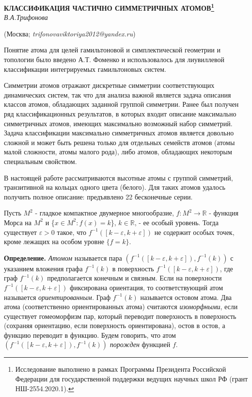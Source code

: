
\begin{center}
    {\bf КЛАССИФИКАЦИЯ  ЧАСТИЧНО СИММЕТРИЧНЫХ АТОМОВ\footnote{Исследование выполнено в рамках Программы Президента Российской Федерации для государственной поддержки ведущих научных школ РФ (грант НШ-2554.2020.1).}}\\

    {\it В.А.Трифонова}

    (Москва; {\it trifonovaviktoriya2012@yandex.ru})
\end{center}


Понятие атома для целей гамильтоновой и симплектической геометрии и топологии было введено А.Т.  Фоменко  и использовалось для лиувиллевой классификации интегрируемых гамильтоновых систем.


Симметрии атомов отражают дискретные симметрии соответствующих динамических систем, так что для  анализа важной является задача описания классов атомов, обладающих заданной группой симметрии. Ранее был получен ряд классификационных результатов, в которых входит описание максимально симметричных атомов, имеющих максимально возможный набор симметрий.  Задача классификации максимально симметричных атомов является довольно сложной  и может быть решена только для отдельных семейств атомов (атомы малой сложности, атомы малого рода), либо атомов, обладающих некоторым специальным свойством.

В 	настоящей работе рассматриваются высотные атомы с группой симметрий, транзитивной на кольцах одного цвета (белого). Для таких атомов удалось получить полное описание: предъявлено 22  бесконечные серии.




Пусть $M^2$ - гладкое компактное двумерное многообразие,  $f:M^2 \to \mathbb{R}$ - функция Морса	на $M^2$ и  \{$x\in M^2 \colon f(x)=k $\}, $k \in \mathbb{R}$, - ее особый уровень. Тогда существует ${\varepsilon > 0}$ такое, что ${f^{-1}([k-\varepsilon, k+\varepsilon ])}$ не содержит особых точек, кроме лежащих на особом уровне		$\{f=k\}$.
		
		
		
		{\bf Определение.}
		{\em Атомом} называется пара ${(f^{-1}([k-\varepsilon, k+\varepsilon ]), f^{-1}(k))}$ с указанием вложения графа ${f^{-1}(k)}$ в поверхность ${f^{-1}([k-\varepsilon, k+\varepsilon ])}$, где граф  ${f^{-1}(k)}$ предполагается конечным и связным. Если на поверхности ${f^{-1}([k-\varepsilon, k+\varepsilon ])}$ фиксирована ориентация, то соответствующий атом называется {\em  ориентированным.} Граф  ${f^{-1}(k)}$ называется остовом атома. Два атома (соответственно ориентированных атома) считаются {\em изоморфными}, если существует гомеоморфизм пар, который переводит поверхность в поверхность (сохраняя ориентацию, если поверхность ориентирована), остов в остов, а функцию переводит в функцию. Будем говорить, что атом
${(f^{-1}([k-\varepsilon, k+\varepsilon ]),f^{-1}(k))}$ {\em порожден} функцией $f$.




